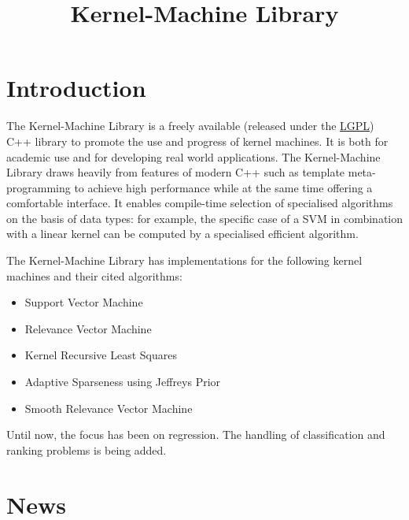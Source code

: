 \documentclass{article}
\begin{document}
\title{Kernel-Machine Library}
\maketitle



\section*{Introduction}

The Kernel-Machine Library is a freely available (released under the 
\href{http://www.gnu.org/copyleft/lesser.html}{LGPL}) C++ library to
promote the use and progress of kernel machines. 
It is both for academic use and for developing real world applications. 
The Kernel-Machine Library draws heavily from features of modern C++ such 
as template meta-programming to achieve high 
performance while at the same time offering a comfortable interface. 
It enables compile-time selection of specialised algorithms on the basis of data types: for example, 
the specific case of a SVM in combination with a linear kernel can be computed by a 
specialised efficient algorithm. 

The Kernel-Machine Library has implementations for the following kernel machines and their cited
algorithms:
%
\begin{itemize}
\item Support Vector Machine \citep{platt99fast,ma03accurate,engel02sparse}
\item Relevance Vector Machine \citep{tipping03fast}
\item Kernel Recursive Least Squares \citep{engel03kernel}
\item Adaptive Sparseness using Jeffreys Prior \citep{figueiredo03adaptive}
\item Smooth Relevance Vector Machine \citep{terborg05smooth}
\end{itemize}
%
Until now, the focus has been on regression. The handling of classification and ranking problems 
is being added.


\section*{News}
\end{document}
